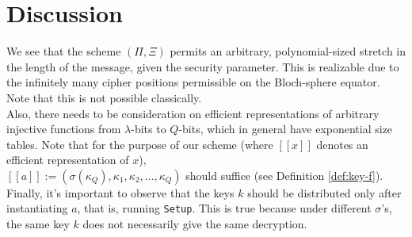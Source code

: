 \section{Discussion}

We see that the scheme $(\Pi,\Xi)$ permits an arbitrary, polynomial-sized stretch in the length of the message, given the security parameter. This is realizable due to the infinitely many cipher positions permissible on the Bloch-sphere equator. Note that this is not possible classically. \\
Also, there needs to be consideration on efficient representations of arbitrary injective functions from $\lambda$-bits to $Q$-bits, which in general have exponential size tables. Note that for the purpose of our scheme (where $[[x]]$ denotes an efficient representation of $x$), \\ 
$[[a]] := (\sigma(\kappa_Q), \kappa_1, \kappa_2, ..., \kappa_Q)$ should suffice (see Definition \ref{def:key-f}). \\
Finally, it's important to observe that the keys $k$ should be distributed only after instantiating $a$, that is, running \texttt{Setup}. This is true because under different $\sigma$'s, the same key $k$ does not necessarily give the same decryption.